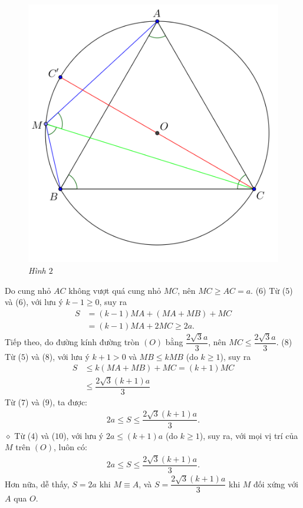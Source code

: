\begin{multicols}{2}
\begin{figure}[H]
		\includegraphics[width= 0.7\linewidth]{P665H2}
		\caption{\small\textit{\color{thachthuctoanhoc}Hình $2$}}
		\vspace*{-10pt}
	\end{figure}
	Do cung nhỏ $AC$ không vượt quá cung nhỏ $MC$, nên $MC \ge AC = a$. \hfill ($6$)
	\vskip 0.05cm
	Từ ($5$) và ($6$), với lưu ý $k - 1 \ge 0$, suy ra
	\begin{align*}
		S &= (k - 1)MA + (MA + MB) + MC \\
		&= (k - 1)MA + 2MC \ge 2a.                      \tag{$7$}
	\end{align*}
	Tiếp theo, do đường kính đường tròn $(O)$ bằng $\dfrac{2\sqrt{3}a}{3}$, nên  $MC \le \dfrac{2\sqrt{3}a}{3}$. \hfill ($8$)
	\vskip 0.05cm
	Từ ($5$) và ($8$), với lưu ý $k + 1 > 0$ và $MB \le kMB$ (do $k \ge 1$), suy ra
	\begin{align*}
		S &\le k\left( {MA + MB} \right) + MC = \left( {k + 1} \right)MC \\
		&\le \dfrac{{2\sqrt 3 \left( {k + 1} \right)a}}{3} \tag{$9$}
	\end{align*}
	Từ ($7$) và ($9$), ta được:
	\begin{align*}
		2a \le S \le \dfrac{{2\sqrt 3 \left( {k + 1} \right)a}}{3}. \tag{$10$}
	\end{align*}
	$\diamond$ Từ ($4$) và ($10$), với lưu ý $2a \le (k + 1)a$ (do $k \ge 1$), suy ra, với mọi vị trí của $M$ trên $(O)$, luôn có:
	\begin{align*}
		2a \le S \le \dfrac{{2\sqrt 3 \left( {k + 1} \right)a}}{3}. 
	\end{align*}
	Hơn nữa, dễ thấy, $S = 2a$ khi $M \equiv A$, và $S = \dfrac{{2\sqrt 3 \left( {k + 1} \right)a}}{3}$  khi $M$ đối xứng với $A$ qua $O$.

\end{multicols}
